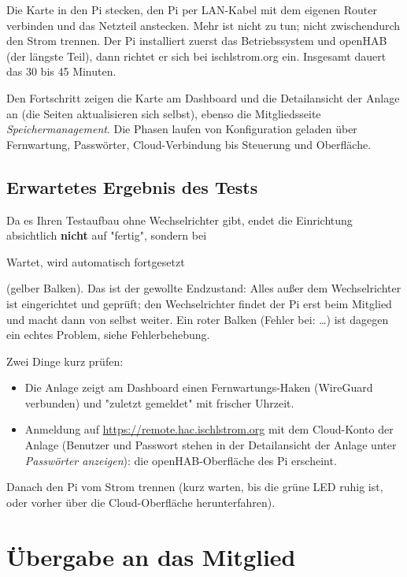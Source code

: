 \documentclass[a4paper,11pt]{article}
\newcommand{\phase}[1]{\textsf{\small #1}}
\begin{document}
Die Karte in den Pi stecken, den Pi per LAN-Kabel mit dem eigenen Router
verbinden und das Netzteil anstecken. Mehr ist nicht zu tun; nicht
zwischendurch den Strom trennen. Der Pi installiert zuerst das
Betriebssystem und openHAB (der längste Teil), dann richtet er sich bei
ischlstrom.org ein. Insgesamt dauert das 30 bis 45 Minuten.

Den Fortschritt zeigen die Karte am Dashboard und die Detailansicht der
Anlage an (die Seiten aktualisieren sich selbst), ebenso die Mitgliedsseite
\emph{Speichermanagement}. Die Phasen laufen von
\phase{Konfiguration geladen} über \phase{Fernwartung},
\phase{Passwörter}, \phase{Cloud-Verbindung} bis \phase{Steuerung} und
\phase{Oberfläche}.

\subsection*{Erwartetes Ergebnis des Tests}

Da es Ihren Testaufbau ohne Wechselrichter gibt, endet die Einrichtung
absichtlich \textbf{nicht} auf "fertig", sondern bei

\begin{center}
    \phase{Wartet, wird automatisch fortgesetzt}
\end{center}

(gelber Balken). Das ist der gewollte Endzustand: Alles außer dem
Wechselrichter ist eingerichtet und geprüft; den Wechselrichter findet
der Pi erst beim Mitglied und macht dann von selbst weiter. Ein roter
Balken (\phase{Fehler bei: \ldots}) ist dagegen ein echtes Problem,
siehe Fehlerbehebung.

Zwei Dinge kurz prüfen:

\begin{itemize}[nosep]
    \item Die Anlage zeigt am Dashboard einen Fernwartungs-Haken
          (WireGuard verbunden) und "zuletzt gemeldet" mit frischer
          Uhrzeit.
    \item Anmeldung auf \url{https://remote.hac.ischlstrom.org} mit dem
          Cloud-Konto der Anlage (Benutzer und Passwort stehen in der
          Detailansicht der Anlage unter \emph{Passwörter anzeigen}): die
          openHAB-Oberfläche des Pi erscheint.
\end{itemize}

Danach den Pi vom Strom trennen (kurz warten, bis die grüne LED ruhig
ist, oder vorher über die Cloud-Oberfläche herunterfahren).

\section{Übergabe an das Mitglied}
\end{document}
